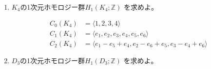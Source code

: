 \documentclass[12pt,b5paper]{ltjsarticle}
\begin{document}
\begin{enumerate}
       \begin{enumerate}
        \item
             $K_{4}$の1次元ホモロジー群$H_1(K_{4} ; \mathbb{Z})$
             を求めよ。

             \dotfill

             \begin{align}
              C_{0}(K_{4})
                &= \langle 1,2,3,4 \rangle\\
              C_{1}(K_{4})
                &= \langle e_{1},e_{2},e_{3},e_{4},e_{5},e_{6} \rangle\\
              C_{2}(K_{4})
                &= \langle
                  e_{1}-e_{5}+e_{4}, e_{2}-e_{6}+e_{5},e_{3}-e_{4}+e_{6}
                \rangle
             \end{align}


             \hrulefill
        \item
             $D_{3}$の1次元ホモロジー群$H_1(D_{3} ; \mathbb{Z})$
             を求めよ。

             \dotfill

             \hrulefill
       \end{enumerate}


\end{enumerate}

\hrulefill
\end{document}
